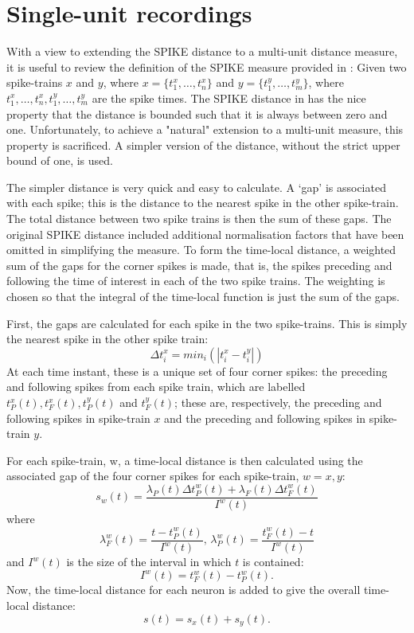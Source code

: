 \section{Single-unit recordings}
With a view to extending the SPIKE distance to a multi-unit distance measure, it is useful to review the definition of the SPIKE measure provided in \cite{Kreuzetal2011}:  Given two spike-trains $x$ and $y$, where $x = \{ t_1^x, \ldots, t_n^x \}$ and $y = \{ t_1^y, \ldots , t_m^y\}$, where $t_1^x,\ldots,t_n^x,t_1^y,\ldots,t_m^y$ are the spike times.  The SPIKE distance in \cite{Kreuzetal2011} has the nice property that the distance is bounded such that it is always between zero and one.  Unfortunately, to achieve a "natural" extension to a multi-unit measure, this property is sacrificed.  A simpler version of the distance, without the strict upper bound of one, is used.

The simpler distance is very quick and easy to calculate.  A `gap' is associated with each spike; this is the distance to the nearest spike in the other spike-train.  The total distance between two spike trains is then the sum of these gaps.  The original SPIKE distance included additional normalisation factors that have been omitted in simplifying the measure.  To form the time-local distance, a weighted sum of the gaps for the corner spikes is made, that is, the spikes preceding and following the time of interest in each of the two spike trains.  The weighting is chosen so that the integral of the time-local function is just the sum of the gaps.

First, the gaps are calculated for each spike in the two spike-trains.  This is simply the nearest spike in the other spike train:
\begin{equation}
\Delta t_i^x = min_i ( | t_i^x - t_i^y |)
\end{equation}
At each time instant, these is a unique set of four corner spikes: the preceding and following spikes from each spike train, which are labelled $t_P^x(t), t_F^x(t), t_P^y(t)$ and  $t_F^y(t)$; these are, respectively, the preceding and following spikes in spike-train $x$ and the preceding and following spikes in spike-train $y$.

For each spike-train, w, a time-local distance is then calculated using the associated gap of the four corner spikes for each spike-train, $w=x,y$:
\begin{equation}
s_w(t) = \frac{\lambda_P(t) \Delta t_P^w(t) + \lambda_F(t)\Delta t_F^w(t)}{I^w(t)}
\end{equation}
where
\begin{equation}
\lambda_F^w(t) = \frac{t- t_P^w(t)}{I^w(t)}, \, \lambda_P^w(t) = \frac{ t_F^w(t) - t}{I^w(t)}
\end{equation}
and $I^w(t)$ is the size of the interval in which $t$ is contained:
\begin{equation}
I^w(t) = t_F^w(t) - t_P^w(t).
\end{equation}
Now, the time-local distance for each neuron is added to give the overall time-local distance:
\begin{equation}
s(t) = s_x(t) + s_y(t).
\end{equation}

